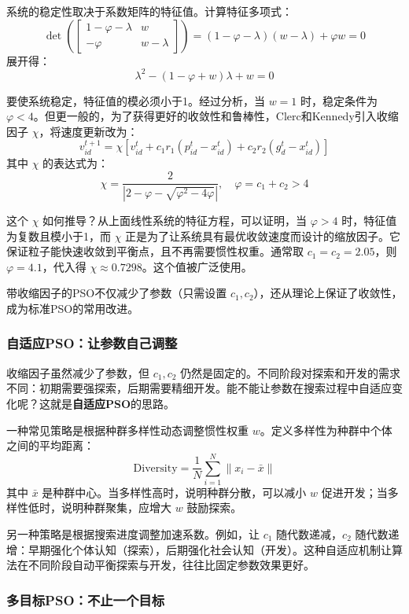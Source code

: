 \documentclass[lang=cn,zihao=-4,a4paper,fontset=windows]{beautybook}
\begin{document}
系统的稳定性取决于系数矩阵的特征值。计算特征多项式：
\[
\det\left(
\begin{bmatrix}
1-\varphi - \lambda & w \\
-\varphi & w - \lambda
\end{bmatrix}
\right) = (1-\varphi - \lambda)(w - \lambda) + \varphi w = 0
\]
展开得：
\[
\lambda^2 - (1-\varphi + w)\lambda + w = 0
\]

要使系统稳定，特征值的模必须小于1。经过分析，当 $w=1$ 时，稳定条件为 $\varphi < 4$。但更一般的，为了获得更好的收敛性和鲁棒性，Clerc和Kennedy引入收缩因子 $\chi$，将速度更新改为：
\[
v_{id}^{t+1} = \chi \left[ v_{id}^t + c_1 r_1 (p_{id}^t - x_{id}^t) + c_2 r_2 (g_d^t - x_{id}^t) \right]
\]
其中 $\chi$ 的表达式为：
\[
\chi = \frac{2}{|2 - \varphi - \sqrt{\varphi^2 - 4\varphi}|}, \quad \varphi = c_1 + c_2 > 4
\]

这个 $\chi$ 如何推导？从上面线性系统的特征方程，可以证明，当 $\varphi > 4$ 时，特征值为复数且模小于1，而 $\chi$ 正是为了让系统具有最优收敛速度而设计的缩放因子。它保证粒子能快速收敛到平衡点，且不再需要惯性权重。通常取 $c_1 = c_2 = 2.05$，则 $\varphi = 4.1$，代入得 $\chi \approx 0.7298$。这个值被广泛使用。

带收缩因子的PSO不仅减少了参数（只需设置 $c_1, c_2$），还从理论上保证了收敛性，成为标准PSO的常用改进。

\subsubsection{自适应PSO：让参数自己调整}

收缩因子虽然减少了参数，但 $c_1, c_2$ 仍然是固定的。不同阶段对探索和开发的需求不同：初期需要强探索，后期需要精细开发。能不能让参数在搜索过程中自适应变化呢？这就是\textbf{自适应PSO}的思路。

一种常见策略是根据种群多样性动态调整惯性权重 $w$。定义多样性为种群中个体之间的平均距离：
\[
\text{Diversity} = \frac{1}{N} \sum_{i=1}^N \| x_i - \bar{x} \|
\]
其中 $\bar{x}$ 是种群中心。当多样性高时，说明种群分散，可以减小 $w$ 促进开发；当多样性低时，说明种群聚集，应增大 $w$ 鼓励探索。

另一种策略是根据搜索进度调整加速系数。例如，让 $c_1$ 随代数递减，$c_2$ 随代数递增：早期强化个体认知（探索），后期强化社会认知（开发）。这种自适应机制让算法在不同阶段自动平衡探索与开发，往往比固定参数效果更好。

\subsubsection{多目标PSO：不止一个目标}
\end{document}
